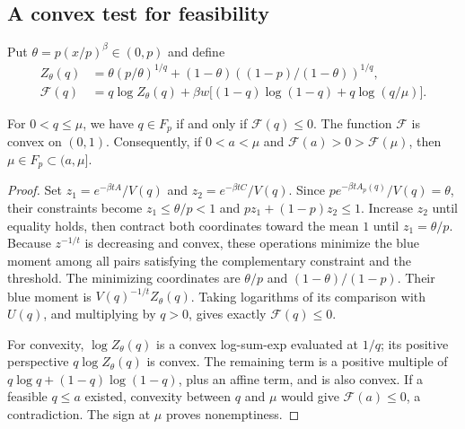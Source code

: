 \subsection{A convex test for feasibility}

Put $\theta=p(x/p)^\beta\in(0,p)$ and define
\begin{equation}\label{eq:entropy-test}
 \begin{aligned}
 Z_\theta(q)&=\theta(p/\theta)^{1/q}
       +(1-\theta)((1-p)/(1-\theta))^{1/q},\\
 \mathcal F(q)&=q\log Z_\theta(q)
       +\beta w\bigl[(1-q)\log(1-q)+q\log(q/\mu)\bigr].
 \end{aligned}
\end{equation}

\begin{lemma}\label{lem:feasibility-cutoff}
For $0<q\le\mu$, we have $q\in F_p$ if and only if $\mathcal F(q)\le0$.
The function $\mathcal F$ is convex on $(0,1)$. Consequently, if
$0<a<\mu$ and $\mathcal F(a)>0>\mathcal F(\mu)$, then
$\mu\in F_p\subset(a,\mu]$.
\end{lemma}
\begin{proof}
Set
$z_1=e^{-\beta tA}/V(q)$ and $z_2=e^{-\beta tC}/V(q)$.
Since $p e^{-\beta tA_p(q)}/V(q)=\theta$, their constraints become
$z_1\le\theta/p<1$ and $pz_1+(1-p)z_2\le1$.
Increase $z_2$ until equality holds, then contract both coordinates toward
the mean $1$ until $z_1=\theta/p$. Because $z^{-1/t}$ is decreasing
and convex, these operations minimize the blue moment among all pairs
satisfying the complementary constraint and the threshold.
The minimizing coordinates are $\theta/p$ and $(1-\theta)/(1-p)$.
Their blue moment is $V(q)^{-1/t}Z_\theta(q)$.
Taking logarithms of its comparison with $U(q)$, and multiplying by
$q>0$, gives exactly $\mathcal F(q)\le0$.

For convexity, $\log Z_\theta(q)$ is a convex log-sum-exp evaluated at
$1/q$; its positive perspective $q\log Z_\theta(q)$ is convex.
The remaining term is a positive multiple of
$q\log q+(1-q)\log(1-q)$, plus an affine term, and is also convex.
If a feasible $q\le a$ existed, convexity between $q$ and $\mu$ would
give $\mathcal F(a)\le0$, a contradiction. The sign at $\mu$ proves
nonemptiness.
\end{proof}

